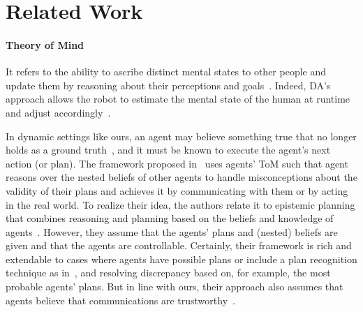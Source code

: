 \documentclass[letterpaper]{article} %
\begin{document}

\section{Related Work}
\paragraph{Theory of Mind}
It refers to the ability to ascribe distinct mental states to other people and update them by reasoning about their perceptions and goals~\cite{baron1985does}. 
Indeed, DA's approach allows the robot to estimate the mental state of the human at runtime and adjust accordingly~\cite{devin2016implemented}. 

In dynamic settings like ours, an agent may believe something true that no longer holds as a ground truth~\cite{DissingB20}, and it must be known to execute the agent's next action (or plan).
The framework proposed in~\cite{ShvoKM22} uses agents' ToM such that agent reasons over the nested beliefs of other agents to handle misconceptions about the validity of their plans and achieves it by communicating with them or by acting in the real world. To realize their idea, the authors relate it to epistemic planning that combines reasoning and planning based on the beliefs and knowledge of agents~\cite{petrick2002knowledge,BolanderA11}.
However, they assume that the agents' plans and (nested) beliefs are given and that the agents are controllable. Certainly, their framework is rich and extendable to cases where agents have possible plans or include a plan recognition technique as in~\cite{CirilloKS09}, and resolving discrepancy based on, for example, the most probable agents' plans.
But in line with ours, their approach also assumes that agents believe that communications are trustworthy~\cite{fabiano2021multi}.
\end{document}
